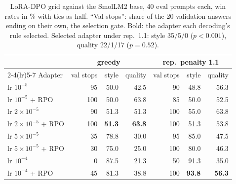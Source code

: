 \begin{table}[!ht]
\centering
\small
\begin{tabular}{lrrrrrr}
\toprule
& \multicolumn{3}{c}{greedy} & \multicolumn{3}{c}{rep.\ penalty 1.1} \\
\cmidrule(lr){2-4}\cmidrule(lr){5-7}
Adapter & val stops & style & quality & val stops & style & quality \\
\midrule
lr $10^{-5}$ & 95 & 50.0 & 42.5 & 90 & 48.8 & 56.3 \\
lr $10^{-5}$ + RPO & 100 & 50.0 & 63.8 & 85 & 50.0 & 52.5 \\
lr $2{\times}10^{-5}$ & 90 & 51.3 & 51.3 & 100 & 55.0 & 63.8 \\
lr $2{\times}10^{-5}$ + RPO & 100 & \textbf{51.3} & \textbf{63.8} & 100 & 51.3 & 53.8 \\
lr $5{\times}10^{-5}$ & 35 & 78.8 & 30.0 & 95 & 85.0 & 47.5 \\
lr $5{\times}10^{-5}$ + RPO & 30 & 75.0 & 25.0 & 100 & 80.0 & 46.3 \\
lr $10^{-4}$ & 0 & 87.5 & 21.3 & 50 & 91.3 & 35.0 \\
lr $10^{-4}$ + RPO & 45 & 81.3 & 38.8 & 100 & \textbf{93.8} & \textbf{56.3} \\
\bottomrule
\end{tabular}
\caption{LoRA-DPO grid against the SmolLM2 base, 40 eval prompts each, win rates in \% with ties as half. ``Val
stops'': share of the 20 validation answers ending on their own, the selection gate. Bold: the adapter each decoding's rule selected. Selected adapter under rep.\ 1.1: style 35/5/0
($p<0.001$), quality 22/1/17 ($p=0.52$).}
\label{tab:persona}
\end{table}
